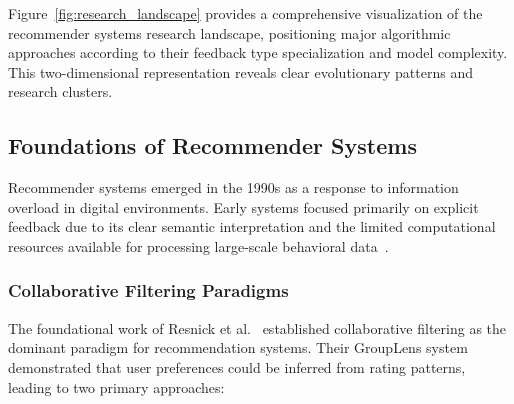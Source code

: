 \begin{figure*}[ht]
\caption{Research Landscape Map: Recommendation Algorithms by Feedback Type and Complexity. Bubble size indicates research impact. Three trajectories: classical explicit methods (left), implicit approaches (right), hybrid systems (center).}
\label{fig:research_landscape}
\end{figure*}

Figure~\ref{fig:research_landscape} provides a comprehensive visualization of the recommender systems research landscape, positioning major algorithmic approaches according to their feedback type specialization and model complexity. This two-dimensional representation reveals clear evolutionary patterns and research clusters.

\subsection{Foundations of Recommender Systems}

Recommender systems emerged in the 1990s as a response to information overload in digital environments. Early systems focused primarily on explicit feedback due to its clear semantic interpretation and the limited computational resources available for processing large-scale behavioral data~\cite{resnick1994grouplens,shardanand1995social}.

\subsubsection{Collaborative Filtering Paradigms}
The foundational work of Resnick et al.~\cite{resnick1994grouplens} established collaborative filtering as the dominant paradigm for recommendation systems. Their GroupLens system demonstrated that user preferences could be inferred from rating patterns, leading to two primary approaches:

